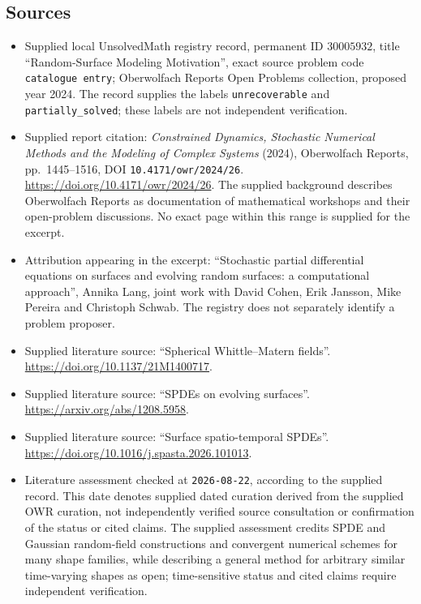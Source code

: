 \documentclass[11pt]{article}
\begin{document}
\subsection{Sources}
\begin{itemize}
\item Supplied local UnsolvedMath registry record, permanent ID \(30005932\), title ``Random-Surface Modeling Motivation'', exact source problem code \texttt{catalogue entry}; Oberwolfach Reports Open Problems collection, proposed year 2024. The record supplies the labels \texttt{unrecoverable} and \texttt{partially\_solved}; these labels are not independent verification.
\item Supplied report citation: \emph{Constrained Dynamics, Stochastic Numerical Methods and the Modeling of Complex Systems} (2024), Oberwolfach Reports, pp.~1445--1516, DOI \texttt{10.4171/owr/2024/26}. \url{https://doi.org/10.4171/owr/2024/26}. The supplied background describes Oberwolfach Reports as documentation of mathematical workshops and their open-problem discussions. No exact page within this range is supplied for the excerpt.
\item Attribution appearing in the excerpt: ``Stochastic partial differential equations on surfaces and evolving random surfaces: a computational approach'', Annika Lang, joint work with David Cohen, Erik Jansson, Mike Pereira and Christoph Schwab. The registry does not separately identify a problem proposer.
\item Supplied literature source: ``Spherical Whittle--Matern fields''. \url{https://doi.org/10.1137/21M1400717}.
\item Supplied literature source: ``SPDEs on evolving surfaces''. \url{https://arxiv.org/abs/1208.5958}.
\item Supplied literature source: ``Surface spatio-temporal SPDEs''. \url{https://doi.org/10.1016/j.spasta.2026.101013}.
\item Literature assessment checked at \texttt{2026-08-22}, according to the supplied record. This date denotes supplied dated curation derived from the supplied OWR curation, not independently verified source consultation or confirmation of the status or cited claims. The supplied assessment credits SPDE and Gaussian random-field constructions and convergent numerical schemes for many shape families, while describing a general method for arbitrary similar time-varying shapes as open; time-sensitive status and cited claims require independent verification.
\end{itemize}
\end{document}

